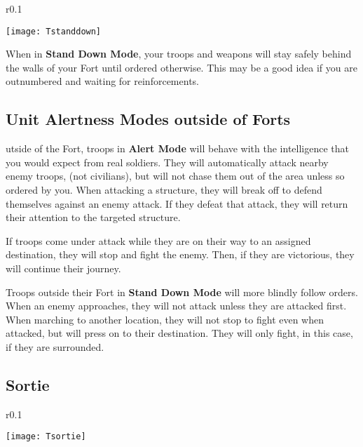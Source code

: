 \begin{wrapfigure}{r}{0.1\textwidth}
    \vspace{-20pt}
    \begin{center}
        \texttt{[image: Tstanddown]}
    \end{center}
    \vspace{-20pt}
\end{wrapfigure}

When in \textbf{Stand Down Mode}, your troops and weapons will stay safely behind the walls of your Fort until ordered otherwise. This may be a good idea if you are outnumbered and waiting for reinforcements.

\subsection{\textsf{Unit Alertness Modes outside of Forts}}


utside of the Fort, troops in \textbf{Alert Mode} will behave with the intelligence that you would expect from real soldiers. They will automatically attack nearby enemy troops, (not civilians), but will not chase them out of the area unless so ordered by you. When attacking a structure, they will break off to defend themselves against an enemy attack. If they defeat that attack, they will return their attention to the targeted structure.

If troops come under attack while they are on their way to an assigned destination, they will stop and fight the enemy. Then, if they are victorious, they will continue their journey.

Troops outside their Fort in \textbf{Stand Down Mode} will more blindly follow orders. When an enemy approaches, they will not attack unless they are attacked first. When marching to another location, they will not stop to fight even when attacked, but will press on to their destination. They will only fight, in this case, if they are surrounded.

\subsection{\textsf{Sortie}}


\begin{wrapfigure}{r}{0.1\textwidth}
    \vspace{-20pt}
    \begin{center}
        \texttt{[image: Tsortie]}
    \end{center}
    \vspace{-20pt}
\end{wrapfigure}

